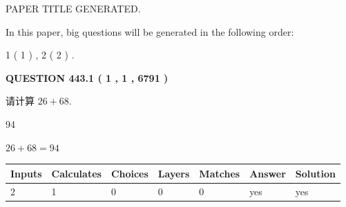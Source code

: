 \documentclass{ctexart}
\begin{document}
   
 \vspace{0.2in}
 
 
 
 
   
   
 PAPER TITLE GENERATED.
   
   
   
\vspace{0.2in}
   
In this paper, big questions will be generated in the following order: 
   
   
   1 ( 1 )
 ,
   2 ( 2 )
 .
  
\vspace{0.2in}
  
{\textbf{\Large{QUESTION
443.1 
 ( 1 , 1 , 6791 )
}}}
  
  
 
请计算 $ %
26 +  %
68 $.
 
 
 
\noindent{}
 
 

94
 
 
\noindent{}
 
 

 
 
 
\noindent{}
 
 

$ %
26 +  %
68=   %
94$
 
 
\noindent{}
 
 

 
   
   
   
   
\noindent\begin{tabular}{|l|l|l|l|l|l|l|}
 \hline
Inputs & Calculates & Choices & Layers & Matches & Answer & Solution \\ \hline
 2  & 
 1  & 
 0
  & 
 0  & 
 0  & 
  yes & 
  yes 
  \\ \hline
 \end{tabular}
   
   
   
   
\noindent{}
   
   
  
\end{document}
